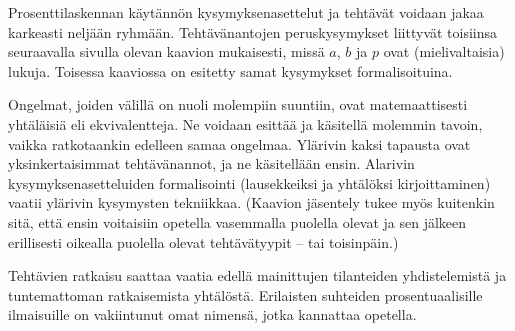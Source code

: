 Prosenttilaskennan käytännön kysymyksenasettelut ja tehtävät voidaan jakaa karkeasti neljään ryhmään. Tehtävänantojen peruskysymykset liittyvät toisiinsa seuraavalla sivulla olevan kaavion mukaisesti, missä $a$, $b$ ja $p$ ovat (mielivaltaisia) lukuja. Toisessa kaaviossa on esitetty samat kysymykset formalisoituina.
\newpage
{}

Ongelmat, joiden välillä on nuoli molempiin suuntiin, ovat matemaattisesti yhtäläisiä eli ekvivalentteja. Ne voidaan esittää ja käsitellä molemmin tavoin, vaikka ratkotaankin edelleen samaa ongelmaa. Ylärivin kaksi tapausta ovat yksinkertaisimmat tehtävänannot, ja ne käsitellään ensin. Alarivin kysymyksenasetteluiden formalisointi (lausekkeiksi ja yhtälöksi kirjoittaminen) vaatii ylärivin kysymysten tekniikkaa. (Kaavion jäsentely tukee myös kuitenkin sitä, että ensin voitaisiin opetella vasemmalla puolella olevat ja sen jälkeen erillisesti oikealla puolella olevat tehtävätyypit -- tai toisinpäin.)

Tehtävien ratkaisu saattaa vaatia edellä mainittujen tilanteiden yhdistelemistä ja tuntemattoman ratkaisemista yhtälöstä. Erilaisten suhteiden prosentuaalisille ilmaisuille on vakiintunut omat nimensä, jotka kannattaa opetella.

